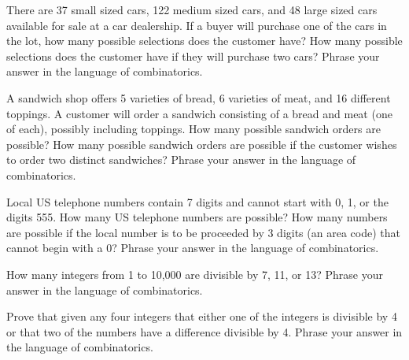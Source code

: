 \documentclass[11pt,letterpaper]{article}
\begin{document}
\homework{}

 There are 37 small sized cars, 122 medium sized cars, and 48 large sized cars available for sale at a car dealership. If a buyer will purchase one of the cars in the lot, how many possible selections does the customer have? How many possible selections does the customer have if they will purchase two cars? Phrase your answer in the language of combinatorics. \pspace





\newpage





 A sandwich shop offers 5 varieties of bread, 6 varieties of meat, and 16 different toppings. A customer will order a sandwich consisting of a bread and meat (one of each), possibly including toppings. How many possible sandwich orders are possible? How many possible sandwich orders are possible if the customer wishes to order two distinct sandwiches? Phrase your answer in the language of combinatorics. \pspace





\newpage





 Local US telephone numbers contain 7 digits and cannot start with 0, 1, or the digits 555. How many US telephone numbers are possible? How many numbers are possible if the local number is to be proceeded by 3 digits (an area code) that cannot begin with a 0? Phrase your answer in the language of combinatorics. \pspace





\newpage





 How many integers from 1 to 10,000 are divisible by 7, 11, or 13? Phrase your answer in the language of combinatorics. \pspace





\newpage





 Prove that given any four integers that either one of the integers is divisible by 4 or that two of the numbers have a difference divisible by 4. Phrase your answer in the language of combinatorics. \pspace
\end{document}
